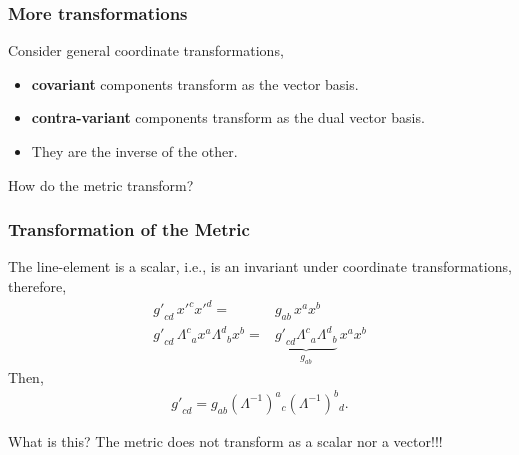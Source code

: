 \begin{frame}
  \frametitle{More transformations}
  Consider general coordinate transformations, 
  \begin{center}
  \end{center}
  \begin{itemize}
  \item {\color{green!70!black} {\bf covariant} components transform as the vector basis}.
  \item {\color{blue!70!black} {\bf contra-variant} components transform as the dual vector basis}.
  \item They are the inverse of the other.
  \end{itemize}

  \alert{How do the metric transform?}
\end{frame}


\begin{frame}
  \frametitle{Transformation of the Metric}
  The \alert{line-element is a scalar}, i.e., is an invariant under coordinate transformations, therefore,
  \begin{align*}
     {g'}_{cd}\,{x'}^c{x'}^d=& g_{ab} \,x^a x^b\\
    {g'}_{cd}\,\Lambda^c{}_a{x}^a \Lambda^d{}_b{x}^b =& \underbrace{{g'}_{cd}\Lambda^c{}_a\Lambda^d{}_b}_{g_{ab}}\,{x}^a {x}^b
  \end{align*}
Then,
\begin{align*}
  {g'}_{cd} = g_{ab}(\Lambda^{-1})^a{}_c(\Lambda^{-1})^b{}_d.
\end{align*}
\begin{alertblock}{What is this?}
  The metric does not transform as a scalar nor a vector!!!
\end{alertblock}
\end{frame}


